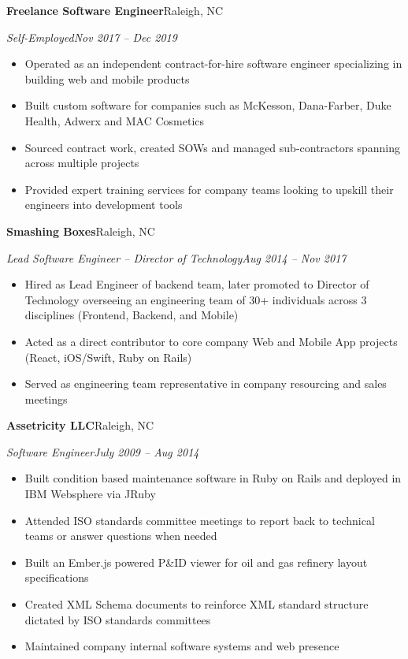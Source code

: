 \documentclass[10pt,letterpaper]{article}
\newcommand{\resumeentry}[4]{%
  \par\addvspace{6pt}
  {\bfseries #1}\hfill #2\par
  \textit{#3}\hfill \textit{#4}\par
}
\newenvironment{resumebullets}{%
  \begin{itemize}[
    leftmargin=1.5em,
    label=\textbullet,
    itemsep=1pt,
    parsep=0pt,
    topsep=3pt,
    partopsep=0pt
  ]
}{%
  \end{itemize}
}
\begin{document}
\resumeentry{Freelance Software Engineer}{Raleigh, NC}
  {Self-Employed}{Nov 2017 -- Dec 2019}
\begin{resumebullets}
  \item Operated as an independent contract-for-hire software engineer specializing in building web and mobile products
  \item Built custom software for companies such as McKesson, Dana-Farber, Duke Health, Adwerx and MAC Cosmetics
  \item Sourced contract work, created SOWs and managed sub-contractors spanning across multiple projects
  \item Provided expert training services for company teams looking to upskill their engineers into development tools
\end{resumebullets}

\resumeentry{Smashing Boxes}{Raleigh, NC}
  {Lead Software Engineer -- Director of Technology}{Aug 2014 -- Nov 2017}
\begin{resumebullets}
  \item Hired as Lead Engineer of backend team, later promoted to Director of Technology overseeing an engineering team of 30+ individuals across 3 disciplines (Frontend, Backend, and Mobile)
  \item Acted as a direct contributor to core company Web and Mobile App projects (React, iOS/Swift, Ruby on Rails)
  \item Served as engineering team representative in company resourcing and sales meetings
\end{resumebullets}

\resumeentry{Assetricity LLC}{Raleigh, NC}
  {Software Engineer}{July 2009 -- Aug 2014}
\begin{resumebullets}
  \item Built condition based maintenance software in Ruby on Rails and deployed in IBM Websphere via JRuby
  \item Attended ISO standards committee meetings to report back to technical teams or answer questions when needed
  \item Built an Ember.js powered P\&ID viewer for oil and gas refinery layout specifications
  \item Created XML Schema documents to reinforce XML standard structure dictated by ISO standards committees
  \item Maintained company internal software systems and web presence
\end{resumebullets}
\end{document}
